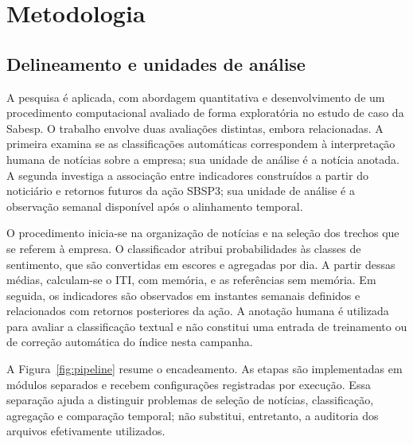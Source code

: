 \chapter{Metodologia}
\label{cap:metodologia}

\section{Delineamento e unidades de análise}

A pesquisa é aplicada, com abordagem quantitativa e desenvolvimento de um procedimento computacional avaliado de forma exploratória no estudo de caso da Sabesp. O trabalho envolve duas avaliações distintas, embora relacionadas. A primeira examina se as classificações automáticas correspondem à interpretação humana de notícias sobre a empresa; sua unidade de análise é a notícia anotada. A segunda investiga a associação entre indicadores construídos a partir do noticiário e retornos futuros da ação SBSP3; sua unidade de análise é a observação semanal disponível após o alinhamento temporal.

O procedimento inicia-se na organização de notícias e na seleção dos trechos que se referem à empresa. O classificador atribui probabilidades às classes de sentimento, que são convertidas em escores e agregadas por dia. A partir dessas médias, calculam-se o ITI, com memória, e as referências sem memória. Em seguida, os indicadores são observados em instantes semanais definidos e relacionados com retornos posteriores da ação. A anotação humana é utilizada para avaliar a classificação textual e não constitui uma entrada de treinamento ou de correção automática do índice nesta campanha.

A Figura~\ref{fig:pipeline} resume o encadeamento. As etapas são implementadas em módulos separados e recebem configurações registradas por execução. Essa separação ajuda a distinguir problemas de seleção de notícias, classificação, agregação e comparação temporal; não substitui, entretanto, a auditoria dos arquivos efetivamente utilizados.


